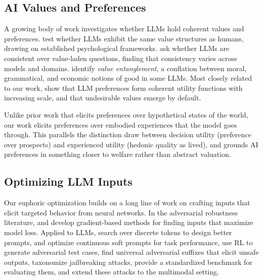 \subsection{AI Values and Preferences}
\label{app:rw-values}

A growing body of work investigates whether LLMs hold coherent values and preferences. \citet{rozen2024llms} test whether LLMs exhibit the same value structures as humans, drawing on established psychological frameworks. \citet{moore2024large} ask whether LLMs are consistent over value-laden questions, finding that consistency varies across models and domains. \citet{cho2026value} identify \emph{value entanglement}, a conflation between moral, grammatical, and economic notions of good in some LLMs. Most closely related to our work, \citet{mazeika2025utility} show that LLM preferences form coherent utility functions with increasing scale, and that undesirable values emerge by default.

Unlike prior work that elicits preferences over hypothetical states of the world, our work elicits preferences over embodied experiences that the model goes through. This parallels the distinction \citet{kahneman1997back} draw between decision utility (preference over prospects) and experienced utility (hedonic quality as lived), and grounds AI preferences in something closer to welfare rather than abstract valuation.

\subsection{Optimizing LLM Inputs}
\label{app:rw-optimizing}

Our euphoric optimization builds on a long line of work on crafting inputs that elicit targeted behavior from neural networks. In the adversarial robustness literature, \citet{szegedy2013intriguing} and \citet{madry2017towards} develop gradient-based methods for finding inputs that maximize model loss. Applied to LLMs, \citet{shin2020autoprompt} search over discrete tokens to design better prompts, \citet{lester2021power} and \citet{li2021prefix} optimize continuous soft prompts for task performance, \citet{perez2022red} use RL to generate adversarial test cases, \citet{zou2023universal} find universal adversarial suffixes that elicit unsafe outputs, \citet{wei2023jailbroken} taxonomize jailbreaking attacks, \citet{mazeika2024harmbench} provide a standardized benchmark for evaluating them, and \citet{niu2024jailbreaking} extend these attacks to the multimodal setting.

